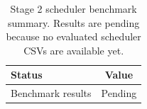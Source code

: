 \begin{table}[t]
\centering
\small
\begin{tabular}{lc}
\toprule
Status & Value \\
\midrule
Benchmark results & Pending \\
\bottomrule
\end{tabular}
\caption{Stage 2 scheduler benchmark summary. Results are pending because no evaluated scheduler CSVs are available yet.}
\label{tab:stage2_scheduler_summary}
\end{table}

